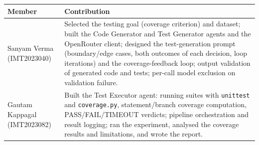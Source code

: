 \documentclass[11pt,a4paper]{article}
\begin{document}
\begin{table}[H]
\centering\small
\begin{tabularx}{\linewidth}{l >{\raggedright\arraybackslash}X}
\toprule
Member & Contribution\\
\midrule
Sanyam Verma (IMT2023040) &
Selected the testing goal (coverage criterion) and dataset; built the Code Generator and
Test Generator agents and the OpenRouter client; designed the test-generation prompt
(boundary/edge cases, both outcomes of each decision, loop iterations) and the
coverage-feedback loop; output validation of generated code and tests; per-call model
exclusion on validation failure.\\
Gautam Kappagal (IMT2023082) &
Built the Test Executor agent: running suites with \texttt{unittest} and
\texttt{coverage.py}, statement/branch coverage computation, PASS/FAIL/TIMEOUT verdicts;
pipeline orchestration and result logging; ran the experiment, analysed the coverage
results and limitations, and wrote the report.\\
\bottomrule
\end{tabularx}
\end{table}
\end{document}
